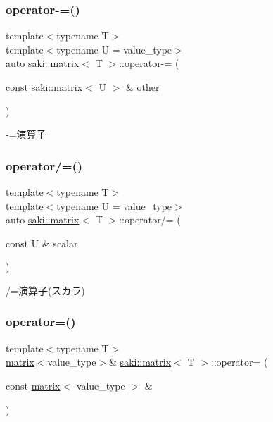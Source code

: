 \subsubsection{\texorpdfstring{operator-\/=()}{operator-=()}}
{\footnotesize\ttfamily template$<$typename T$>$ \\
template$<$typename U  = value\+\_\+type$>$ \\
auto \mbox{\hyperlink{classsaki_1_1matrix}{saki\+::matrix}}$<$ T $>$\+::operator-\/= (\begin{DoxyParamCaption}\item[{const \mbox{\hyperlink{classsaki_1_1matrix}{saki\+::matrix}}$<$ U $>$ \&}]{other }\end{DoxyParamCaption})\hspace{0.3cm}{\ttfamily [inline]}}



-\/=演算子 

\mbox{\label{classsaki_1_1matrix_af70c929f45bbea2192aab47d49882d3c}} 
\subsubsection{\texorpdfstring{operator/=()}{operator/=()}}
{\footnotesize\ttfamily template$<$typename T$>$ \\
template$<$typename U  = value\+\_\+type$>$ \\
auto \mbox{\hyperlink{classsaki_1_1matrix}{saki\+::matrix}}$<$ T $>$\+::operator/= (\begin{DoxyParamCaption}\item[{const U \&}]{scalar }\end{DoxyParamCaption})\hspace{0.3cm}{\ttfamily [inline]}}



/=演算子(スカラ) 

\mbox{\label{classsaki_1_1matrix_a38c5f7e666e3888d90b1c4017219f53f}} 
\subsubsection{\texorpdfstring{operator=()}{operator=()}\hspace{0.1cm}{\footnotesize\ttfamily [1/2]}}
{\footnotesize\ttfamily template$<$typename T$>$ \\
\mbox{\hyperlink{classsaki_1_1matrix}{matrix}}$<$value\+\_\+type$>$\& \mbox{\hyperlink{classsaki_1_1matrix}{saki\+::matrix}}$<$ T $>$\+::operator= (\begin{DoxyParamCaption}\item[{const \mbox{\hyperlink{classsaki_1_1matrix}{matrix}}$<$ value\+\_\+type $>$ \&}]{ }\end{DoxyParamCaption})\hspace{0.3cm}{\ttfamily [default]}}


